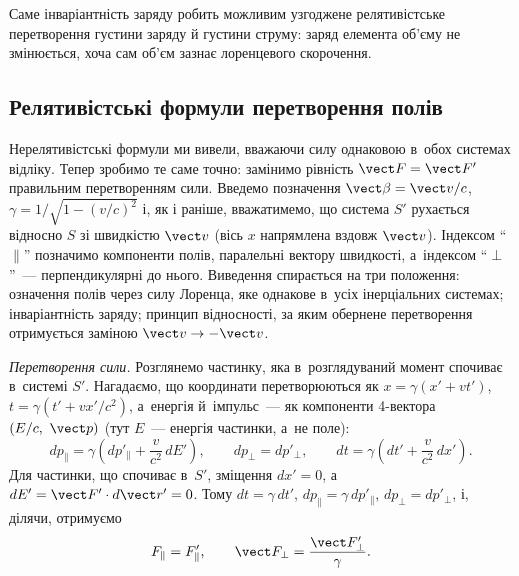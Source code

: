Саме інваріантність заряду робить можливим узгоджене релятивістське перетворення густини заряду й
густини струму: заряд елемента об'єму не змінюється, хоча сам об'єм зазнає лоренцевого
скорочення.

\subsection*{Релятивістські формули перетворення полів}

Нерелятивістські формули ми вивели, вважаючи силу однаковою в~обох системах відліку. Тепер
зробимо те саме точно: замінимо рівність $\vect F = \vect F'$ правильним перетворенням
сили. Введемо позначення $\vect\beta = \vect v/c$, $\gamma = 1/\sqrt{1-(v/c)^2}$ і, як і
раніше, вважатимемо, що система $S'$ рухається відносно $S$ зі швидкістю $\vect v$ (вісь
$x$ напрямлена вздовж $\vect v$). Індексом \enquote{$\parallel$} позначимо компоненти полів,
паралельні вектору швидкості, а~індексом \enquote{$\perp$}~--- перпендикулярні до нього. Виведення
спирається на три положення: означення полів через силу Лоренца, яке однакове в~усіх
інерціальних системах; інваріантність заряду; принцип відносності, за яким обернене
перетворення отримується заміною $\vect v \to -\vect v$.

\emph{Перетворення сили.} Розглянемо частинку, яка в~розглядуваний момент спочиває в~системі
$S'$. Нагадаємо, що координати перетворюються як $x = \gamma(x' + vt')$, $t = \gamma(t' + vx'/c^2)$,
а~енергія й~імпульс~--- як компоненти 4-вектора $(E/c,\ \vect p)$ (тут $E$~--- енергія частинки, а~не поле):
\begin{equation*}
	dp_\parallel = \gamma\left(dp'_\parallel + \frac{v}{c^2}\,dE'\right), \qquad
	dp_\perp = dp'_\perp, \qquad dt = \gamma\left(dt' + \frac{v}{c^2}\,dx'\right).
\end{equation*}
Для частинки, що спочиває в~$S'$, зміщення $dx' = 0$, а~$dE' = \vect F'\cdot
d\vect r' = 0$. Тому $dt = \gamma\,dt'$, $dp_\parallel = \gamma\,dp'_\parallel$, $dp_\perp
= dp'_\perp$, і, ділячи, отримуємо
\begin{equation*}
	F_\parallel = F'_\parallel, \qquad \vect F_\perp = \frac{\vect F'_\perp}{\gamma}.
\end{equation*}

